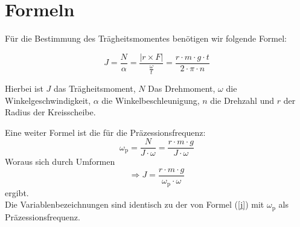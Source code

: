 \documentclass[fontsize=12pt]{scrartcl}
\renewcommand{\l}{\left\vert}
\renewcommand{\r}{\right\vert}
\begin{document}
\noindent
\newpage


\section{Formeln}

Für die Bestimmung des Trägheitsmomentes benötigen wir folgende Formel:

\begin{equation}
J = \frac{N}{\alpha} = \frac{\l r \times F \r}{\frac{\omega}{t}} = 	\frac{r \cdot m \cdot g \cdot t}{2 \cdot \pi \cdot n}
\label{j}
\end{equation}

Hierbei ist $J$ das Trägheitsmoment, $N$ Das Drehmoment, $\omega$ die Winkelgeschwindigkeit, $\alpha$ die Winkelbeschleunigung, $n$ die Drehzahl und $r$ der Radius der Kreisscheibe. \par

Eine weiter Formel ist die für die Präzessionsfrequenz:
\begin{equation}
\omega_{\text{p}} = \frac{N}{J\cdot \omega} = \frac{r \cdot m \cdot g}{J\cdot \omega}
\end{equation}
Woraus sich durch Umformen
\begin{equation}
\Rightarrow J = \frac{r \cdot m \cdot g}{\omega_{\text{p}}\cdot \omega}
\label{p}
\end{equation}
ergibt.\\
Die Variablenbezeichnungen sind identisch zu der von Formel (\ref{j}) mit $\omega_{\text{p}}$ als Präzessionsfrequenz.
\end{document}
